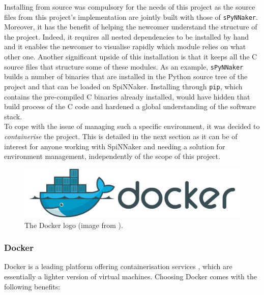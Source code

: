 Installing from source was compulsory for the needs of this project as the source files from this project's implementation are jointly built with those of \texttt{sPyNNaker}. Moreover, it has the benefit of helping the newcomer understand the structure of the project. Indeed, it requires all nested dependencies to be installed by hand and it enables the newcomer to visualise rapidly which module relies on what other one. Another significant upside of this installation is that it keeps all the C source files that structure some of these modules. As an example, \texttt{sPyNNaker} builds a number of binaries that are installed in the Python source tree of the project and that can be loaded on SpiNNaker. Installing through \texttt{pip}, which contains the pre-compiled C binaries already installed, would have hidden that build process of the C code and hardened a global understanding of the software stack. \\

To cope with the issue of managing such a specific environment, it was decided to \textit{containerise} the project. This is detailed in the next section as it can be of interest for anyone working with SpiNNaker and needing a solution for environment management, independently of the scope of this project. \\

\begin{figure}[hbtp]
\centering 
\includegraphics[width=1\hsize]{figures/docker-banner.png}
\caption{The Docker logo (image from \cite{docker}).}
\label{fig:docker}
\end{figure}

\subsubsection{Docker}

Docker is a leading platform offering containerisation services \cite{docker}, which are essentially a lighter version of virtual machines. Choosing Docker comes with the following benefits:

